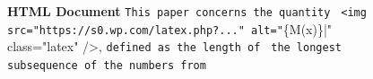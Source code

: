 
\lstset{
  basicstyle=\ttfamily,
  escapechar=| %
}

\begin{figure}[ht]
\begin{tcolorbox}[colback=mybrown!5!white,colframe=mybrown!75!black]
\begin{small}
\textbf{HTML Document}
\lstinline|This paper concerns the quantity |
\lstinline|<img src="https://s0.wp.com/latex.php?..." alt="|\colorbox{highlightcolor}{\{M(x)\}}|" class="latex" />,
\lstinline|defined as the length of |
\lstinline|the longest subsequence of the numbers from|
\end{small}
\end{tcolorbox}
\end{figure}